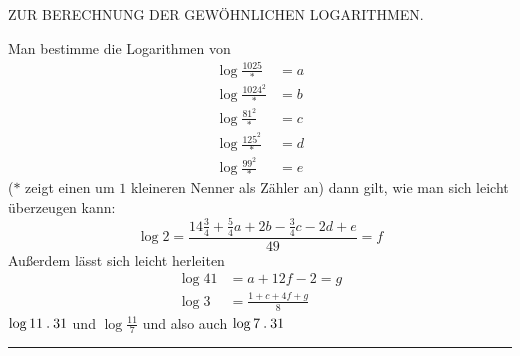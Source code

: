 \clearpage
{}%
\renewcommand{\BookRunningTitle}{Zur Berechnung der gewöhnlichen Logarithmen}
\begin{center}\Large ZUR BERECHNUNG DER GEWÖHNLICHEN LOGARITHMEN.\end{center}
Man bestimme die Logarithmen von
\[
\begin{aligned}
\log\frac{1025}{*}&=a\\
\log\frac{1024^2}{*}&=b\\
\log\frac{81^2}{*}&=c\\
\log\frac{125^2}{*}&=d\\
\log\frac{99^2}{*}&=e
\end{aligned}
\]
($*$ zeigt einen um $1$ kleineren Nenner als Zähler an) dann gilt, wie man sich leicht überzeugen kann:
\[
\log 2=\frac{14\frac34+\frac54a+2b-\frac34c-2d+e}{49}=f
\]
Außerdem lässt sich leicht herleiten
\[
\begin{aligned}
\log 41&=a+12f-2=g\\
\log 3&=\frac{1+c+4f+g}{8}
\end{aligned}
\]
$\log 11\mathbin{.}31$ und $\log\frac{11}{7}$ und also auch $\log 7\mathbin{.}31$\par\medskip\noindent\rule{.32\textwidth}{.3pt}
